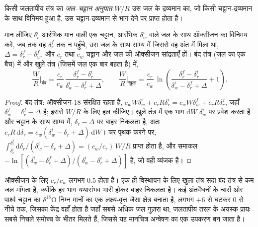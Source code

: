 \begin{definition}[जल--चट्टान अनुपात]\label{def:b3:water-rock-interaction:water-rock-ratio}
किसी जलतापीय तंत्र का \emph{जल--चट्टान अनुपात} $W/R$ उस जल के
द्रव्यमान का, जो किसी चट्टान-द्रव्यमान के साथ विनिमय हुआ है,
उस चट्टान-द्रव्यमान से भाग देने पर प्राप्त होता है।
\end{definition}

\begin{proposition}[ऑक्सीजन समस्थानिकों से जल--चट्टान अनुपात]\label{prop:b3:water-rock-interaction:wr}
मान लीजिए $\delta_r^i$ आरंभिक मान वाली एक चट्टान, आरंभिक $\delta_w^i$ वाले जल के साथ
ऑक्सीजन का विनिमय करे, जब तक वह $\delta_r^f$ तक न पहुँचे, उस जल के साथ साम्य में
जिससे वह अंत में मिला था, $\Delta = \delta_r^f - \delta_w^f$, और $c_r$ तथा $c_w$ चट्टान और जल की
ऑक्सीजन सांद्रताएँ हों। बंद तंत्र (जल का एक बैच) में और खुले तंत्र
(जिसमें जल एक बार बहता है) में,
\[
\frac WR\Big|_{\text{बंद}} = \frac{c_r}{c_w}\,
\frac{\delta_r^f - \delta_r^i}{\delta_w^i - \delta_r^f + \Delta},
\qquad
\frac WR\Big|_{\text{खुला}} = \frac{c_r}{c_w}\,
\ln\!\left(\frac{\delta_r^f - \delta_r^i}{\delta_w^i - \delta_r^f + \Delta} + 1\right).
\]
\end{proposition}

\begin{proof}
बंद तंत्र: ऑक्सीजन-18 संरक्षित रहता है, $c_wW\delta_w^i + c_rR\delta_r^i = c_wW
\delta_w^f + c_rR\delta_r^f$, जहाँ $\delta_w^f = \delta_r^f - \Delta$ है;
इससे $W/R$ के लिए हल कीजिए। खुले तंत्र में एक भाग $\mathrm dW$ $\delta_w^i$ पर प्रवेश करता है और
चट्टान के साथ साम्य में, $\delta_r - \Delta$ पर बाहर निकलता है, अतः $c_rR\,\mathrm d\delta_r
= c_w(\delta_w^i - \delta_r + \Delta)\,\mathrm dW$। चर पृथक करने पर,
$\int_{\delta_r^i}^{\delta_r^f}\mathrm d\delta_r/(\delta_w^i - \delta_r +
\Delta) = (c_w/c_r)\,W/R$ प्राप्त होता है, और समाकल $-\ln[(\delta_w^i - \delta_r^f
+ \Delta)/(\delta_w^i - \delta_r^i + \Delta)]$ है, जो वही व्यंजक है।
\end{proof}

ऑक्सीजन के लिए $c_r/c_w$ लगभग 0.5 होता है। एक ही विस्थापन के लिए खुला तंत्र सदा
बंद तंत्र से कम जल माँगता है, क्योंकि हर भाग यथासंभव भारी होकर
बाहर निकलता है। कई अंतर्वेधनों के चारों ओर पार्श्व चट्टान का $\delta^{18}\mathrm O$
निम्न मानों का एक लक्ष्य-वृत्त जैसा क्षेत्र बनाता है, लगभग $+6$ से घटकर
0 से नीचे तक, जिसका केंद्र वहाँ होता है जहाँ सबसे अधिक जल गुज़रा था; जलतापीय
तरल के अयस्क प्रायः सबसे निचले समोच्च के भीतर मिलते हैं, जिससे यह मानचित्र अन्वेषण
का एक उपकरण बन जाता है।

